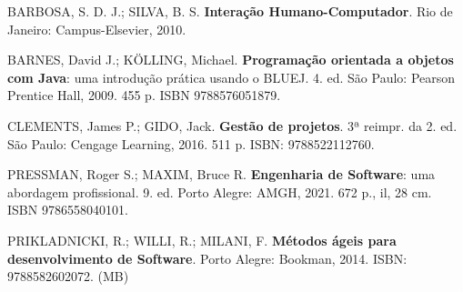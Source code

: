 \begin{pud}
	\begin{bibcomplementar}
		\item BARBOSA, S. D. J.; SILVA, B. S. \textbf{Interação Humano-Computador}. Rio de
Janeiro: Campus-Elsevier, 2010.
		\item BARNES, David J.; KÖLLING, Michael. \textbf{Programação orientada a objetos com
Java}: uma introdução prática usando o BLUEJ. 4. ed. São Paulo: Pearson
Prentice Hall, 2009. 455 p. ISBN 9788576051879.
		\item CLEMENTS, James P.; GIDO, Jack. \textbf{Gestão de projetos}. 3ª reimpr. da 2. ed. São
Paulo: Cengage Learning, 2016. 511 p. ISBN: 9788522112760.
		\item PRESSMAN, Roger S.; MAXIM, Bruce R. \textbf{Engenharia de Software}: uma abordagem profissional. 9. ed. Porto Alegre: AMGH, 2021. 672 p., il, 28 cm. ISBN 9786558040101.
		\item PRIKLADNICKI, R.; WILLI, R.; MILANI, F. \textbf{Métodos ágeis para desenvolvimento de Software}. Porto Alegre: Bookman, 2014. ISBN: 9788582602072. (MB)
	\end{bibcomplementar}
\end{pud}



